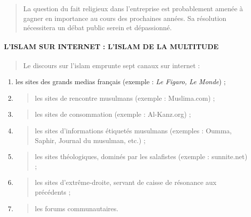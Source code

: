 \begin{quote}
La question du fait religieux dans l'entreprise est probablement amenée
à gagner en importance au cours des prochaines années. Sa résolution
nécessitera un débat public serein et dépassionné.


\end{quote}

\hypertarget{lislam-sur-internet-lislam-de-la-multitude}{%
\paragraph{L'ISLAM SUR INTERNET : L'ISLAM DE LA
MULTITUDE}\label{lislam-sur-internet-lislam-de-la-multitude}}

\begin{quote}
Le discours sur l'islam emprunte sept canaux sur internet :
\end{quote}

\begin{enumerate}
\def\labelenumi{\alph{enumi}.}
\item
  les sites des grands medias français (exemple : \emph{Le Figaro, Le
  Monde}) ;
\item
  \begin{quote}
  les sites de rencontre musulmans (exemple : Muslima.com) ;
  \end{quote}
\item
  \begin{quote}
  les sites de consommation (exemple : Al-Kanz.org) ;
  \end{quote}
\item
  \begin{quote}
  les sites d'informations étiquetés musulmans (exemples : Oumma,
  Saphir, Journal du musulman, etc.) ;
  \end{quote}
\item
  \begin{quote}
  les sites théologiques, dominés par les salafistes (exemple :
  sunnite.net) ;
  \end{quote}
\item
  \begin{quote}
  les sites d'extrême-droite, servant de caisse de résonance aux
  précédents ;
  \end{quote}
\item
  \begin{quote}
  les forums communautaires.
  \end{quote}
\end{enumerate}

